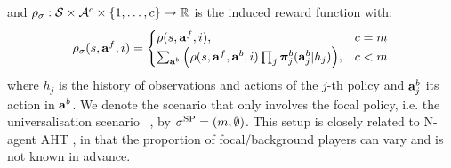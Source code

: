 and $\rho_\sigma: \mathcal{S} \times \mathcal{A}^c \times \{1, \dots, c\} \rightarrow \mathbb{R}$ is the induced reward function with:
\begin{equation*}
\rho_\sigma(s, \mathbf{a}^f, i) =
\begin{cases}
\rho(s, \mathbf{a}^f, i), & c = m\\
\sum_{\mathbf{a}^b} \Big( \rho(s, \mathbf{a}^f, \mathbf{a}^b, i)
\prod_{j} \boldsymbol{\pi}^b_{j}(\mathbf{a}^b_j |h_j)\Big), & c < m \\
\end{cases}
\end{equation*}
where $h_j$ is the history of observations and actions of the $j$-th policy and $\mathbf{a}^b_j$ its action in $\mathbf{a}^b$. We denote the scenario that only involves the focal policy, i.e. the universalisation scenario~ \citep{leibo_scalable_evaluation_multi_2021}, by $\sigma^\text{SP} = (m, \emptyset)$. This setup is closely related to N-agent AHT \citep{wang_n_agent_ad_2024}, in that the proportion of focal/background players can vary and is not known in advance.

